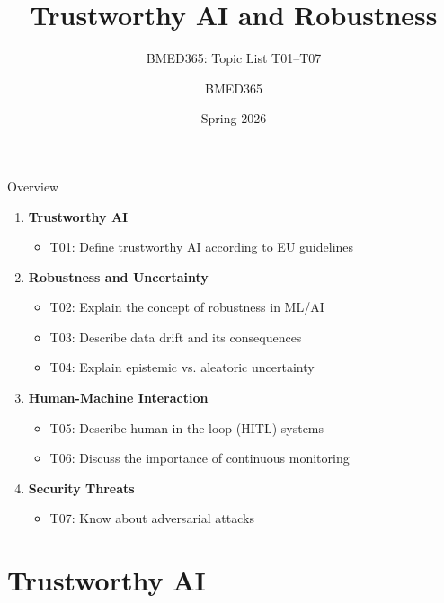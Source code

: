 \documentclass[aspectratio=169, 10pt]{beamer}
\title{Trustworthy AI and Robustness}
\subtitle{BMED365: Topic List T01--T07}
\author{BMED365}
\date{Spring 2026}
\begin{document}
\begin{frame}
    \titlepage
\end{frame}

\begin{frame}{Overview}
    \begin{enumerate}
        \item \textbf{Trustworthy AI}
        \begin{itemize}
            \item T01: Define trustworthy AI according to EU guidelines
        \end{itemize}
        \item \textbf{Robustness and Uncertainty}
        \begin{itemize}
            \item T02: Explain the concept of robustness in ML/AI
            \item T03: Describe data drift and its consequences
            \item T04: Explain epistemic vs. aleatoric uncertainty
        \end{itemize}
        \item \textbf{Human-Machine Interaction}
        \begin{itemize}
            \item T05: Describe human-in-the-loop (HITL) systems
            \item T06: Discuss the importance of continuous monitoring
        \end{itemize}
        \item \textbf{Security Threats}
        \begin{itemize}
            \item T07: Know about adversarial attacks
        \end{itemize}
    \end{enumerate}
\end{frame}

\section{Trustworthy AI}
\end{document}
